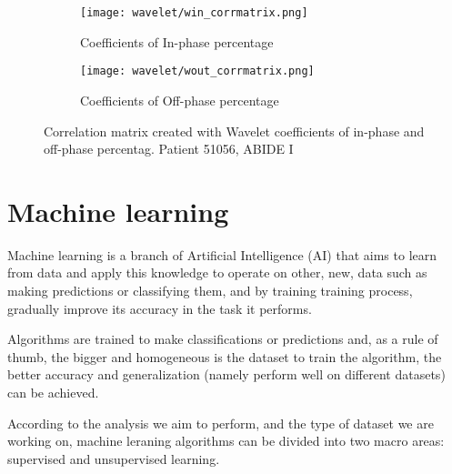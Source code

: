 \documentclass[a4paper,11pt]{article}
\begin{document}
\begin{figure}
\centering
\begin{subfigure}{0.45\textwidth}
\texttt{[image: wavelet/win\_corrmatrix.png]}
\caption{Coefficients of In-phase percentage}
\label{}
\end{subfigure}
\begin{subfigure}{0.45\textwidth}
\texttt{[image: wavelet/wout\_corrmatrix.png]}
\caption{Coefficients of Off-phase percentage}
\label{}
\end{subfigure}
\caption{Correlation matrix created with Wavelet coefficients of in-phase and off-phase percentag. Patient 51056, ABIDE I }
\label{fig:win_wout}
\end{figure}




\newpage

\section{Machine learning}

Machine learning is a branch of Artificial Intelligence (AI) that aims to learn from data and apply this knowledge to operate on other, new, data such as making predictions or classifying them, and by training training process, gradually improve its accuracy in the task it performs.

Algorithms are trained to make classifications or predictions and, as a rule of thumb, the bigger and homogeneous is the dataset to train the algorithm, the better accuracy and generalization (namely perform well on different datasets) can be achieved.

According to the analysis we aim to perform, and the type of dataset we are working on, machine leraning algorithms can be divided into two macro areas: supervised and unsupervised learning.
\end{document}
